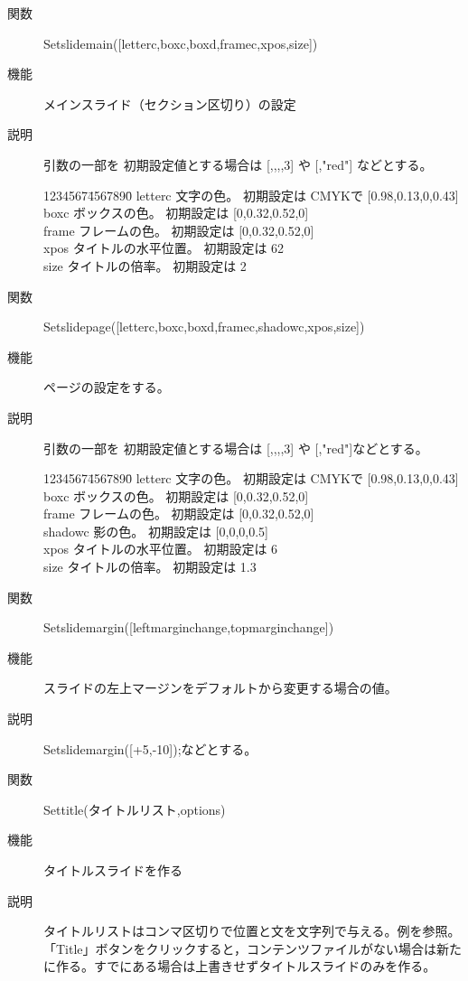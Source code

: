 \documentclass[papersize,a4paper,12pt,uplatex]{jsarticle}
\begin{document}
\begin{description}
\vspace{\baselineskip}
\hypertarget{setslidemain}{}
\item[関数]  Setslidemain([letterc,boxc,boxd,framec,xpos,size])
\item[機能]  メインスライド（セクション区切り）の設定
\item[説明]  引数の一部を 初期設定値とする場合は [,,,,3] や [,"red"] などとする。
\begin{tabbing}
1234567\=4567890\=\kill
letterc \> 文字の色。 初期設定は CMYKで [0.98,0.13,0,0.43]\\
boxc \> ボックスの色。 初期設定は [0,0.32,0.52,0] \\
frame\> フレームの色。 初期設定は [0,0.32,0.52,0]\\
xpos \> タイトルの水平位置。 初期設定は 62\\
size \> タイトルの倍率。 初期設定は 2
\end{tabbing}

\vspace{\baselineskip}
\hypertarget{setslidepage}{}
\item[関数]  Setslidepage([letterc,boxc,boxd,framec,shadowc,xpos,size])
\item[機能]  ページの設定をする。
\item[説明]  引数の一部を 初期設定値とする場合は [,,,,3] や [,"red"]などとする。

\begin{tabbing}
1234567\=4567890\=\kill
letterc \> 文字の色。 初期設定は CMYKで [0.98,0.13,0,0.43]\\
boxc \> ボックスの色。 初期設定は [0,0.32,0.52,0] \\
frame\> フレームの色。 初期設定は [0,0.32,0.52,0]\\
shadowc \> 影の色。 初期設定は [0,0,0,0.5]\\
xpos \> タイトルの水平位置。 初期設定は 6\\
size \> タイトルの倍率。 初期設定は 1.3
\end{tabbing}

\vspace{\baselineskip}
\hypertarget{setslidemargin}{}
\item[関数]  Setslidemargin([leftmarginchange,topmarginchange])
\item[機能]  スライドの左上マージンをデフォルトから変更する場合の値。
\item[説明]  Setslidemargin([+5,-10]);などとする。

\vspace{\baselineskip}
\hypertarget{settitle}{}
\item[関数]  Settitle(タイトルリスト,options)
\item[機能]  タイトルスライドを作る
\item[説明]  タイトルリストはコンマ区切りで位置と文を文字列で与える。例を参照。
「Title」ボタンをクリックすると，コンテンツファイルがない場合は新たに作る。すでにある場合は上書きせずタイトルスライドのみを作る。


\end{description}
\end{document}
